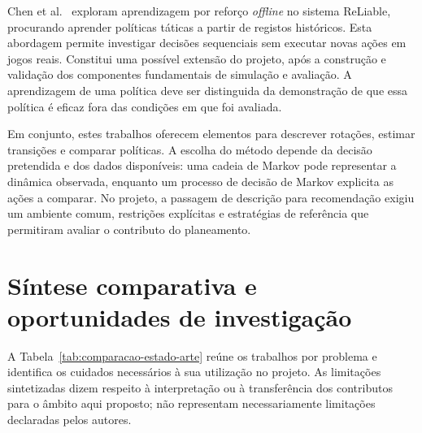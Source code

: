 Chen et al.~\cite{chen2022} exploram aprendizagem por reforço
\emph{offline} no sistema ReLiable, procurando aprender políticas
táticas a partir de registos históricos. Esta abordagem permite
investigar decisões sequenciais sem executar novas ações em jogos
reais. Constitui uma possível extensão do projeto, após a construção
e validação dos componentes fundamentais de simulação e avaliação.
A aprendizagem de uma política deve ser distinguida da demonstração
de que essa política é eficaz fora das condições em que foi avaliada.

Em conjunto, estes trabalhos oferecem elementos para descrever
rotações, estimar transições e comparar políticas. A escolha do método
depende da decisão pretendida e dos dados disponíveis: uma cadeia de
Markov pode representar a dinâmica observada, enquanto um processo de
decisão de Markov explicita as ações a comparar. No projeto, a passagem
de descrição para recomendação exigiu um ambiente comum, restrições
explícitas e estratégias de referência que permitiram avaliar o contributo
do planeamento.

\section{Síntese comparativa e oportunidades de investigação}
\label{plantia:anuxe1lise-cruxedtica-e-relauxe7uxe3o-com-o-projeto}

A Tabela~\ref{tab:comparacao-estado-arte} reúne os trabalhos por problema
e identifica os cuidados necessários à sua utilização no projeto.
As limitações sintetizadas dizem respeito à interpretação ou à
transferência dos contributos para o âmbito aqui proposto; não
representam necessariamente limitações declaradas pelos autores.

